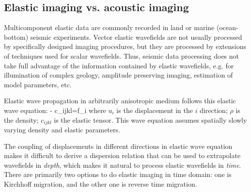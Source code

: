 \subsection{Elastic imaging vs. acoustic imaging }

Multicomponent elastic data are commonly recorded in land or marine (ocean-bottom) seismic experiments. Vector elastic wavefields are not usually processed by specifically designed imaging procedures, but they are processed by extensions of techniques used for scalar wavefields. Thus, seismic data processing does not take full advantage of the information contained by elastic wavefields, e.g. for illumination of complex geology, amplitude preserving imaging, estimation of model parameters, etc.

Elastic wave propagation in arbitrarily anisotropic medium follows this elastic wave equation:
\def\u{u_x}
\def\w{u_z}
\def\dux{\frac{\partial \u}{\partial x } }
\def\duz{\frac{\partial \u}{\partial z } }
\def\dwx{\frac{\partial \w}{\partial x } }
\def\dwz{\frac{\partial \w}{\partial z } }
\beq
\label{eqn:EWE}
\rho{} - c_{ijkl}=f_i
\eeq
where $u_i$ is the displacement in the $i$ direction; $\rho$ is the density; 
$c_{ijkl}$ is the elastic tensor.
This wave equation assumes spatially slowly varying density and elastic parameters.

The coupling of displacements in different directions in elastic wave equation  makes it difficult to derive a dispersion relation that can be used to extrapolate wavefields in \emph{depth}, which makes it natural to process elastic wavefields in \emph{time}. There are primarily two options to do elastic imaging in time domain: one is Kirchhoff migration, and the other one is reverse time migration. 


